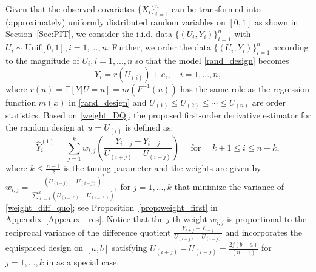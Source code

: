 \documentclass{uwstat572}
\theoremstyle{definition}
\renewcommand{\hat}{\widehat}
\theoremstyle{theorem}
\begin{document}
Given that the observed covariates $\{X_i\}_{i=1}^n$ can be transformed into (approximately) uniformly distributed random variables on $[0,1]$ as shown in Section~\ref{Sec:PIT}, we consider the i.i.d. data $\{(U_i,Y_i)\}_{i=1}^n$ with $U_i\sim \mathrm{Unif}[0,1], i=1,...,n$. Further, we order the data $\{(U_i,Y_i)\}_{i=1}^n$ according to the magnitude of $U_i,i=1,...,n$ so that the model \eqref{rand_design} becomes
\begin{equation}
\label{rand_design_unif}
Y_i=r(U_{(i)}) + e_i, \quad i=1,...,n,
\end{equation}
where $r(u)=\mathbb{E}\left[Y|U=u\right] = m(F^{-1}(u))$ has the same role as the regression function $m(x)$ in \eqref{rand_design} and $U_{(1)} \leq U_{(2)} \leq \cdots \leq U_{(n)}$ are order statistics. Based on \eqref{weight_DQ}, the proposed first-order derivative estimator for the random design at $u=U_{(i)}$ is defined as:
\begin{equation}
\label{weight_diff_quo}
\hat{Y}_i^{(1)} = \sum_{j=1}^k w_{i,j} \left(\frac{Y_{i+j} - Y_{i-j}}{U_{(i+j)} - U_{(i-j)}}\right) \quad \text{ for } \quad k+1\leq i \leq n-k, 
\end{equation}
where $k \leq \frac{n-1}{2}$ is the tuning parameter and the weights are given by
$w_{i,j} = \frac{\left(U_{(i+j)} - U_{(i-j)}\right)^2}{\sum_{\ell=1}^k \left(U_{(i+\ell)} - U_{(i-\ell)}\right)^2}$ for $j=1,...,k$ that minimize the variance of \eqref{weight_diff_quo}; see Proposition~\ref{prop:weight_first} in Appendix~\ref{App:auxi_res}. Notice that the $j$-th weight $w_{i,j}$ is proportional to the reciprocal variance of the difference quotient $\frac{Y_{i+j} - Y_{i-j}}{U_{(i+j)} - U_{(i-j)}}$ and incorporates the equispaced design on $[a,b]$ satisfying $U_{(i+j)} - U_{(i-j)} = \frac{2j(b-a)}{(n-1)}$ for $j=1,...,k$ in \cite{charnigo2011generalized,de2013derivative} as a special case. 
\end{document}
